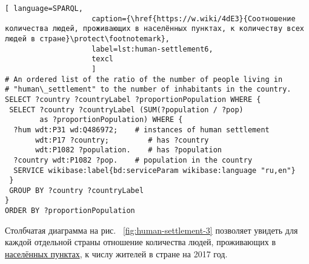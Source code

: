 \begin{lstlisting}[ language=SPARQL, 
                    caption={\href{https://w.wiki/4dE3}{Соотношение количества людей, проживающих в населённых пунктах, к количеству всех людей в стране}\protect\footnotemark},
                    label=lst:human-settlement6,
                    texcl 
                    ]
# An ordered list of the ratio of the number of people living in 
# "human\_settlement" to the number of inhabitants in the country.
SELECT ?country ?countryLabel ?proportionPopulation WHERE {
 SELECT ?country ?countryLabel (SUM(?population / ?pop) 
        as ?proportionPopulation) WHERE {
  ?hum wdt:P31 wd:Q486972;    # instances of human settlement  
       wdt:P17 ?country;         # has ?country 
       wdt:P1082 ?population.    # has ?population
  ?country wdt:P1082 ?pop.    # population in the country
  SERVICE wikibase:label{bd:serviceParam wikibase:language "ru,en"}
 }
 GROUP BY ?country ?countryLabel
}
ORDER BY ?proportionPopulation
\end{lstlisting}%

Столбчатая диаграмма на рис. ~\ref{fig:human-settlement-3} позволяет увидеть для каждой отдельной страны отношение количества людей, проживающих в \href{http://www.wikidata.org/entity/Q486972}{населённых пунктах}, к числу жителей в стране на 2017 год.

\begin{figure*}
    \setlength{\fboxsep}{0pt}%
    \setlength{\fboxrule}{1pt}%
	\label{fig:human-settlement-3}
	\caption[Диаграмма доли населения страны, 2017.]{Диаграмма доли населения страны, проживающего в <<населённых пунктах>> на 2017 год. Ссылка на SPARQL-запрос: \href{https://w.wiki/4dE3}{https://w.wiki/4dE3}}%
\end{figure*} 

\begin{figure*}
    \setlength{\fboxsep}{0pt}%
    \setlength{\fboxrule}{1pt}%
	\label{fig:human-settlement-4}
	\caption[Диаграмма доли населения страны, 2021.]{Диаграмма доли населения страны, проживающего в <<населённых пунктах>> на 2021 год. В 2021 на диаграмму попали только страны с населением более 5 млн человек. Ссылка на SPARQL-запрос: \href{https://w.wiki/4dDx}{https://w.wiki/4dDx}}%
\end{figure*} 

